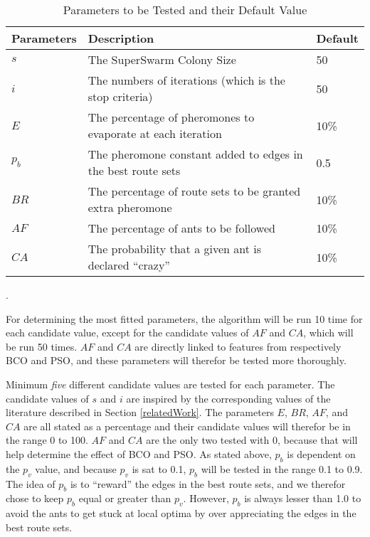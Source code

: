 \begin{table}[H]
	\small
	\begin{tabular}{|l|l|l|}
    	\hline
    	Parameters & Description & Default\\
    	\hline
    	$s$ & The SuperSwarm Colony Size & 50\\
    	$i$ & The numbers of iterations (which is the stop criteria) & 50\\
    	$E$ & The percentage of pheromones to evaporate at each iteration & 10\%\\
    	$p_b$ & The pheromone constant added to edges in the best route sets & 0.5\\
    	$BR$ & The percentage of route sets to be granted extra pheromone & 10\%\\
    	$AF$ & The percentage of ants to be followed & 10\%\\
    	$CA$ & The probability that a given ant is declared ``crazy'' & 10\%\\
   	    \hline
    \end{tabular}
    \caption {Parameters to be Tested and their Default Value}.
    \label{table:parameters}
\end{table}

For determining the most fitted parameters, the algorithm will be run 10 time for each candidate value, except for the candidate values of $AF$ and $CA$, which will be run 50 times. $AF$ and $CA$ are directly linked to features from respectively BCO and PSO, and these parameters will therefor be tested more thoroughly.

Minimum \textit{five} different candidate values are tested for each parameter. The candidate values of $s$ and $i$ are inspired by the corresponding values of the literature described in Section \vref{relatedWork}. The parameters $E$, $BR$, $AF$, and $CA$ are all stated as a percentage and their candidate values will therefor be in the range 0 to 100. $AF$ and $CA$ are the only two tested with 0, because that will help determine the effect of BCO and PSO. As stated above, $p_b$ is dependent on the $p_v$ value, and because $p_v$ is sat to 0.1, $p_b$ will be tested in the range 0.1 to 0.9. The idea of $p_b$ is to ``reward'' the edges in the best route sets, and we therefor chose to keep $p_b$ equal or greater than $p_v$. However, $p_b$ is always lesser than 1.0 to avoid the ants to get stuck at local optima by over appreciating the edges in the best route sets. 

